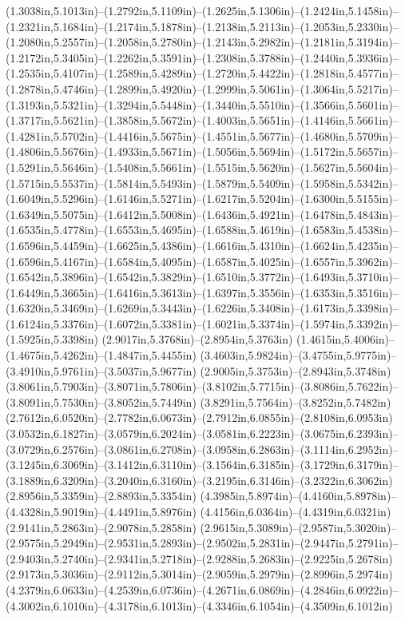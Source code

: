 (1.3038in,5.1013in)--(1.2792in,5.1109in)--(1.2625in,5.1306in)--(1.2424in,5.1458in)--(1.2321in,5.1684in)--(1.2174in,5.1878in)--(1.2138in,5.2113in)--(1.2053in,5.2330in)--(1.2080in,5.2557in)--(1.2058in,5.2780in)--(1.2143in,5.2982in)--(1.2181in,5.3194in)--(1.2172in,5.3405in)--(1.2262in,5.3591in)--(1.2308in,5.3788in)--(1.2440in,5.3936in)--(1.2535in,5.4107in)--(1.2589in,5.4289in)--(1.2720in,5.4422in)--(1.2818in,5.4577in)--(1.2878in,5.4746in)--(1.2899in,5.4920in)--(1.2999in,5.5061in)--(1.3064in,5.5217in)--(1.3193in,5.5321in)--(1.3294in,5.5448in)--(1.3440in,5.5510in)--(1.3566in,5.5601in)--(1.3717in,5.5621in)--(1.3858in,5.5672in)--(1.4003in,5.5651in)--(1.4146in,5.5661in)--(1.4281in,5.5702in)--(1.4416in,5.5675in)--(1.4551in,5.5677in)--(1.4680in,5.5709in)--(1.4806in,5.5676in)--(1.4933in,5.5671in)--(1.5056in,5.5694in)--(1.5172in,5.5657in)--(1.5291in,5.5646in)--(1.5408in,5.5661in)--(1.5515in,5.5620in)--(1.5627in,5.5604in)--(1.5715in,5.5537in)--(1.5814in,5.5493in)--(1.5879in,5.5409in)--(1.5958in,5.5342in)--(1.6049in,5.5296in)--(1.6146in,5.5271in)--(1.6217in,5.5204in)--(1.6300in,5.5155in)--(1.6349in,5.5075in)--(1.6412in,5.5008in)--(1.6436in,5.4921in)--(1.6478in,5.4843in)--(1.6535in,5.4778in)--(1.6553in,5.4695in)--(1.6588in,5.4619in)--(1.6583in,5.4538in)--(1.6596in,5.4459in)--(1.6625in,5.4386in)--(1.6616in,5.4310in)--(1.6624in,5.4235in)--(1.6596in,5.4167in)--(1.6584in,5.4095in)--(1.6587in,5.4025in)--(1.6557in,5.3962in)--(1.6542in,5.3896in)--(1.6542in,5.3829in)--(1.6510in,5.3772in)--(1.6493in,5.3710in)--(1.6449in,5.3665in)--(1.6416in,5.3613in)--(1.6397in,5.3556in)--(1.6353in,5.3516in)--(1.6320in,5.3469in)--(1.6269in,5.3443in)--(1.6226in,5.3408in)--(1.6173in,5.3398in)--(1.6124in,5.3376in)--(1.6072in,5.3381in)--(1.6021in,5.3374in)--(1.5974in,5.3392in)--(1.5925in,5.3398in) (2.9017in,5.3768in)--(2.8954in,5.3763in) (1.4615in,5.4006in)--(1.4675in,5.4262in)--(1.4847in,5.4455in) (3.4603in,5.9824in)--(3.4755in,5.9775in)--(3.4910in,5.9761in)--(3.5037in,5.9677in) (2.9005in,5.3753in)--(2.8943in,5.3748in) (3.8061in,5.7903in)--(3.8071in,5.7806in)--(3.8102in,5.7715in)--(3.8086in,5.7622in)--(3.8091in,5.7530in)--(3.8052in,5.7449in) (3.8291in,5.7564in)--(3.8252in,5.7482in) (2.7612in,6.0520in)--(2.7782in,6.0673in)--(2.7912in,6.0855in)--(2.8108in,6.0953in) (3.0532in,6.1827in)--(3.0579in,6.2024in)--(3.0581in,6.2223in)--(3.0675in,6.2393in)--(3.0729in,6.2576in)--(3.0861in,6.2708in)--(3.0958in,6.2863in)--(3.1114in,6.2952in)--(3.1245in,6.3069in)--(3.1412in,6.3110in)--(3.1564in,6.3185in)--(3.1729in,6.3179in)--(3.1889in,6.3209in)--(3.2040in,6.3160in)--(3.2195in,6.3146in)--(3.2322in,6.3062in) (2.8956in,5.3359in)--(2.8893in,5.3354in) (4.3985in,5.8974in)--(4.4160in,5.8978in)--(4.4328in,5.9019in)--(4.4491in,5.8976in) (4.4156in,6.0364in)--(4.4319in,6.0321in) (2.9141in,5.2863in)--(2.9078in,5.2858in) (2.9615in,5.3089in)--(2.9587in,5.3020in)--(2.9575in,5.2949in)--(2.9531in,5.2893in)--(2.9502in,5.2831in)--(2.9447in,5.2791in)--(2.9403in,5.2740in)--(2.9341in,5.2718in)--(2.9288in,5.2683in)--(2.9225in,5.2678in) (2.9173in,5.3036in)--(2.9112in,5.3014in)--(2.9059in,5.2979in)--(2.8996in,5.2974in) (4.2379in,6.0633in)--(4.2539in,6.0736in)--(4.2671in,6.0869in)--(4.2846in,6.0922in)--(4.3002in,6.1010in)--(4.3178in,6.1013in)--(4.3346in,6.1054in)--(4.3509in,6.1012in) 
